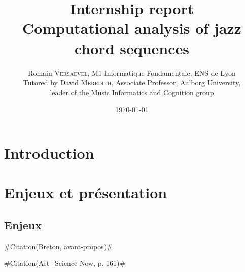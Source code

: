 \documentclass[a4paper,12pt]{article}
\title{\Large Internship report \\ \LARGE Computational analysis of jazz chord sequences}
\author{\normalsize Romain \textsc{Versaevel}, M1 Informatique Fondamentale, ENS de Lyon\\
\normalsize Tutored by David \textsc{Meredith}, Associate Professor, Aalborg University,\\
\normalsize leader of the Music Informatics and Cognition group\\}
\date{\today}
\newcommand{\guill}[1]{«~#1~»}
\newcommand{\zitat}[2]{\#Citation(#2)\#}
\newcommand{\tpp}[0]{[\dots]}
\begin{document}
\maketitle
\newpage

\tableofcontents

\newpage

\section{Introduction}

\section{Enjeux et présentation}

\subsection*{Enjeux}

\zitat{L'ordinateur, pendant longtemps, a été la seule vitrine de l'informatique aux yeux du grand public. Chacun sait mieux maintenant que ce domaine comporte de multiples dimensions : les enjeux industriels, l'univers complexe de la programmation et des langages, les foisonnements des différents usages, mais aussi l'affirmation que la logique et une certaine forme de rationalité dont désormais partie de notre culture contemporaine \tpp~
Désormais de très larges publics sont directement concernés par l'informatique. La question qui est aujourd’hui d'actualité en matières d'informatique est celle de la maîtrise de enjeux que soulève son insertion dans la vie quotidienne. Voilà pourquoi on parle tant de \guill{culture informatique}.}
{Breton, avant-propos}

\zitat{The USA-based curator Christiane Paul organized a pair of related process-oriented shows, both called \emph{CODeDOC}, at the Whitney Museum of American Art in New York (2002) and at Ars Electronica (2003) to explore the conceptual and aesthetic intricacies of code-based art. Artists in each exhibition were given a common challenge for example, to animate three circles connected by lines) and then invited to generate code-based responses. Paul explained her motivations this way in the online catalogue of the Ars Electronica show: \guill{I wanted to raise questions about software art as artistic practice\dots~One intent of the project certainly was to memystify the notion of code as a mysterious, hidden driving force and to reveal the code to the viewer. Among the questions that seemed important to address or clarify were the following: do \emph{signature}, \emph{voice}, and aesthetics of an artist manifest themselbes equally in the written code and its exxecuted results? Will reading the source code enhance the perception of the word? Does it in fact add anything at all or just create an emphasis on \emph{technicalities} that is unnecessary, alienating, and obscures the work?}}
{Art+Science Now, p. 161}
\end{document}
